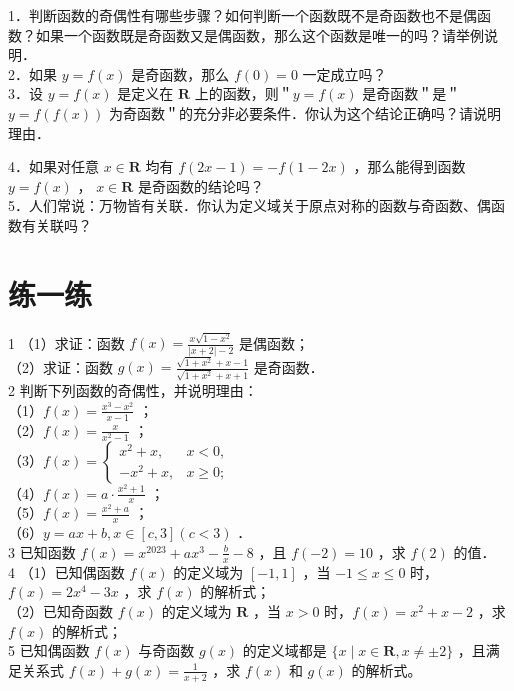 \documentclass[10pt]{article}
\begin{document}
1．判断函数的奇偶性有哪些步骤？如何判断一个函数既不是奇函数也不是偶函数？如果一个函数既是奇函数又是偶函数，那么这个函数是唯一的吗？请举例说明．\\
2．如果 \(y=f(x)\) 是奇函数，那么 \(f(0)=0\) 一定成立吗？\\
3．设 \(y=f(x)\) 是定义在 \(\mathbf{R}\) 上的函数，则＂\(y=f(x)\) 是奇函数＂是＂\(y=f(f(x))\) 为奇函数＂的充分非必要条件．你认为这个结论正确吗？请说明理由．

4．如果对任意 \(x \in \mathbf{R}\) 均有 \(f(2 x-1)=-f(1-2 x)\) ，那么能得到函数 \(y=f(x)\) ， \(x \in \mathbf{R}\) 是奇函数的结论吗？\\
5．人们常说：万物皆有关联．你认为定义域关于原点对称的函数与奇函数、偶函数有关联吗？

\section*{练一练}
1 （1）求证：函数 \(f(x)=\frac{x \sqrt{1-x^{2}}}{|x+2|-2}\) 是偶函数；\\
（2）求证：函数 \(g(x)=\frac{\sqrt{1+x^{2}}+x-1}{\sqrt{1+x^{2}}+x+1}\) 是奇函数．\\
2 判断下列函数的奇偶性，并说明理由：\\
（1）\(f(x)=\frac{x^{3}-x^{2}}{x-1}\) ；\\
（2）\(f(x)=\frac{x}{x^{2}-1}\) ；\\
（3）\(f(x)= \begin{cases}x^{2}+x, & x<0, \\ -x^{2}+x, & x \geqslant 0 ;\end{cases}\)\\
（4）\(f(x)=a \cdot \frac{x^{2}+1}{x}\) ；\\
（5）\(f(x)=\frac{x^{2}+a}{x}\) ；\\
（6）\(y=a x+b, x \in[c, 3](c<3)\) ．\\
3 已知函数 \(f(x)=x^{2023}+a x^{3}-\frac{b}{x}-8\) ，且 \(f(-2)=10\) ，求 \(f(2)\) 的值．\\
4 （1）已知偶函数 \(f(x)\) 的定义域为 \([-1,1]\) ，当 \(-1 \leqslant x \leqslant 0\) 时，\(f(x)=2 x^{4}-3 x\) ，求 \(f(x)\) 的解析式；\\
（2）已知奇函数 \(f(x)\) 的定义域为 \(\mathbf{R}\) ，当 \(x>0\) 时，\(f(x)=x^{2}+x-2\) ，求 \(f(x)\) 的解析式；\\
5 已知偶函数 \(f(x)\) 与奇函数 \(g(x)\) 的定义域都是 \(\{x \mid x \in \mathbf{R}, x \neq \pm 2\}\) ，且满足关系式 \(f(x)+g(x)=\frac{1}{x+2}\) ，求 \(f(x)\) 和 \(g(x)\) 的解析式。
\end{document}
